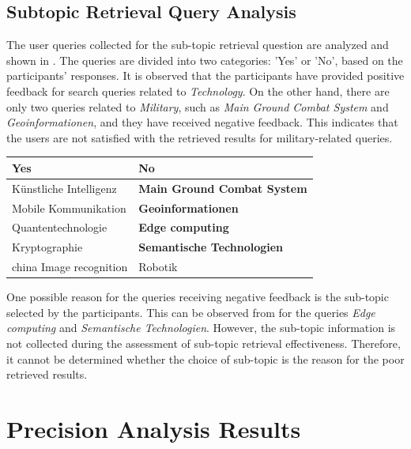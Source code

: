\subsection{Subtopic Retrieval Query Analysis}

The user queries collected for the sub-topic retrieval question are analyzed and shown in . The queries are divided into two categories: 'Yes' or 'No', based on the participants' responses. It is observed that the participants have provided positive feedback for search queries related to \textit{Technology}. On the other hand, there are only two queries related to \textit{Military}, such as \textit{Main Ground Combat System} and \textit{Geoinformationen}, and they have received negative feedback. This indicates that the users are not satisfied with the retrieved results for military-related queries.

\begin{center}
	\label{tab:queries_question_5}
	\begin{tabularx}{.8\textwidth}{|Y|Y|}
		\hline
		Yes & No \\
		\hline
		Künstliche Intelligenz  & \textbf{Main Ground Combat System} \\
		\hline
		Mobile Kommunikation & \textbf{Geoinformationen} \\
		\hline
		Quantentechnologie & \textbf{Edge computing} \\
		\hline
		Kryptographie & \textbf{Semantische Technologien} \\
		\hline
		china Image recognition & Robotik \\
		\hline
	\end{tabularx}
\end{center} 

One possible reason for the queries receiving negative feedback is the sub-topic selected by the participants. This can be observed from  for the queries \textit{Edge computing} and \textit{Semantische Technologien}. However, the sub-topic information is not collected during the assessment of sub-topic retrieval effectiveness. Therefore, it cannot be determined whether the choice of sub-topic is the reason for the poor retrieved results.


\section{Precision Analysis Results}

